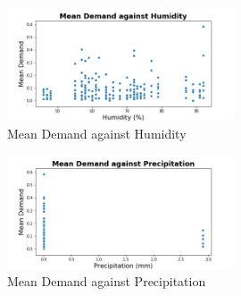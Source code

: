 \documentclass[12pt, letterpaper] {article}
\begin{document}
\begin{figure}[H]
    \centering
    \includegraphics[width=0.6\textwidth, height=0.3\textheight]{Images/humidity_mean_demand.jpg}
    \caption{Mean Demand against Humidity}
    \label{fig:Mean Demand against Humidity}
\end{figure}

\begin{figure}[H]
    \centering
    \includegraphics[width=0.6\textwidth, height=0.3\textheight]{Images/prec_mean_demand.jpg}
    \caption{Mean Demand against Precipitation}
    \label{fig:Mean Demand against Precipitation}
\end{figure}

 

\end{document}
